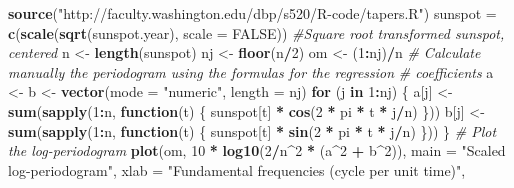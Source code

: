 \documentclass[]{book}
\newenvironment{Shaded}{\begin{snugshade}}{\end{snugshade}}
\newcommand{\CommentTok}[1]{\textcolor[rgb]{0.56,0.35,0.01}{\textit{#1}}}
\newcommand{\ControlFlowTok}[1]{\textcolor[rgb]{0.13,0.29,0.53}{\textbf{#1}}}
\newcommand{\DataTypeTok}[1]{\textcolor[rgb]{0.13,0.29,0.53}{#1}}
\newcommand{\DecValTok}[1]{\textcolor[rgb]{0.00,0.00,0.81}{#1}}
\newcommand{\KeywordTok}[1]{\textcolor[rgb]{0.13,0.29,0.53}{\textbf{#1}}}
\newcommand{\NormalTok}[1]{#1}
\newcommand{\OperatorTok}[1]{\textcolor[rgb]{0.81,0.36,0.00}{\textbf{#1}}}
\newcommand{\OtherTok}[1]{\textcolor[rgb]{0.56,0.35,0.01}{#1}}
\newcommand{\StringTok}[1]{\textcolor[rgb]{0.31,0.60,0.02}{#1}}
\begin{document}
\begin{Shaded}
\begin{Highlighting}[]
\KeywordTok{source}\NormalTok{(}\StringTok{"http://faculty.washington.edu/dbp/s520/R-code/tapers.R"}\NormalTok{)}
\NormalTok{sunspot =}\StringTok{ }\KeywordTok{c}\NormalTok{(}\KeywordTok{scale}\NormalTok{(}\KeywordTok{sqrt}\NormalTok{(sunspot.year), }\DataTypeTok{scale =} \OtherTok{FALSE}\NormalTok{))  }\CommentTok{#Square root transformed sunspot, centered }
\NormalTok{n <-}\StringTok{ }\KeywordTok{length}\NormalTok{(sunspot)}
\NormalTok{nj <-}\StringTok{ }\KeywordTok{floor}\NormalTok{(n}\OperatorTok{/}\DecValTok{2}\NormalTok{)}
\NormalTok{om <-}\StringTok{ }\NormalTok{(}\DecValTok{1}\OperatorTok{:}\NormalTok{nj)}\OperatorTok{/}\NormalTok{n}
\CommentTok{# Calculate manually the periodogram using the formulas for the regression}
\CommentTok{# coefficients}
\NormalTok{a <-}\StringTok{ }\NormalTok{b <-}\StringTok{ }\KeywordTok{vector}\NormalTok{(}\DataTypeTok{mode =} \StringTok{"numeric"}\NormalTok{, }\DataTypeTok{length =}\NormalTok{ nj)}
\ControlFlowTok{for}\NormalTok{ (j }\ControlFlowTok{in} \DecValTok{1}\OperatorTok{:}\NormalTok{nj) \{}
\NormalTok{    a[j] <-}\StringTok{ }\KeywordTok{sum}\NormalTok{(}\KeywordTok{sapply}\NormalTok{(}\DecValTok{1}\OperatorTok{:}\NormalTok{n, }\ControlFlowTok{function}\NormalTok{(t) \{}
\NormalTok{        sunspot[t] }\OperatorTok{*}\StringTok{ }\KeywordTok{cos}\NormalTok{(}\DecValTok{2} \OperatorTok{*}\StringTok{ }\NormalTok{pi }\OperatorTok{*}\StringTok{ }\NormalTok{t }\OperatorTok{*}\StringTok{ }\NormalTok{j}\OperatorTok{/}\NormalTok{n)}
\NormalTok{    \}))}
\NormalTok{    b[j] <-}\StringTok{ }\KeywordTok{sum}\NormalTok{(}\KeywordTok{sapply}\NormalTok{(}\DecValTok{1}\OperatorTok{:}\NormalTok{n, }\ControlFlowTok{function}\NormalTok{(t) \{}
\NormalTok{        sunspot[t] }\OperatorTok{*}\StringTok{ }\KeywordTok{sin}\NormalTok{(}\DecValTok{2} \OperatorTok{*}\StringTok{ }\NormalTok{pi }\OperatorTok{*}\StringTok{ }\NormalTok{t }\OperatorTok{*}\StringTok{ }\NormalTok{j}\OperatorTok{/}\NormalTok{n)}
\NormalTok{    \}))}
\NormalTok{\}}
\CommentTok{# Plot the log-periodogram}
\KeywordTok{plot}\NormalTok{(om, }\DecValTok{10} \OperatorTok{*}\StringTok{ }\KeywordTok{log10}\NormalTok{(}\DecValTok{2}\OperatorTok{/}\NormalTok{n}\OperatorTok{^}\DecValTok{2} \OperatorTok{*}\StringTok{ }\NormalTok{(a}\OperatorTok{^}\DecValTok{2} \OperatorTok{+}\StringTok{ }\NormalTok{b}\OperatorTok{^}\DecValTok{2}\NormalTok{)), }\DataTypeTok{main =} \StringTok{"Scaled log-periodogram"}\NormalTok{, }\DataTypeTok{xlab =} \StringTok{"Fundamental frequencies (cycle per unit time)"}\NormalTok{, }

\end{Highlighting}
\end{Shaded}
\end{document}
